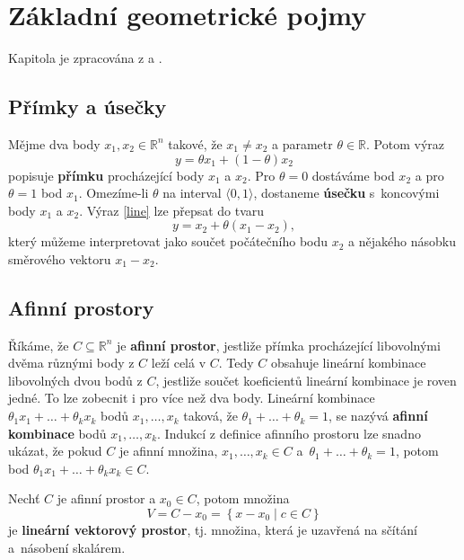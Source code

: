 \chapter{Základní geometrické pojmy}

Kapitola je zpracována z \cite{convex-optimization} a \cite{lectures-on-discrete-geometry}.

\section{Přímky a úsečky}

Mějme dva body $x_1, x_2 \in \mathbb{R}^n$ takové, že $x_1 \neq x_2$ a parametr $\theta \in \mathbb{R}$. Potom výraz
\begin{equation}
    y = \theta x_1 + (1 - \theta) x_2
    \label{line}
\end{equation}
popisuje \textbf{přímku} procházející body $x_1$ a $x_2$. Pro $\theta = 0$ dostáváme bod $x_2$ a pro $\theta = 1$ bod $x_1$. Omezíme-li $\theta$ na interval $\langle 0, 1 \rangle$, dostaneme \textbf{úsečku} s~koncovými body $x_1$ a $x_2$. Výraz \ref{line} lze přepsat do tvaru
$$
    y = x_2 + \theta (x_1 - x_2),
$$
který můžeme interpretovat jako součet počátečního bodu $x_2$ a nějakého násobku směrového vektoru $x_1 - x_2$.

\section{Afinní prostory}

Říkáme, že $C \subseteq \mathbb{R}^n$ je \textbf{afinní prostor}, jestliže přímka procházející libovolnými dvěma různými body z $C$ leží celá v $C$. Tedy $C$ obsahuje lineární kombinace libovolných dvou bodů z $C$, jestliže součet koeficientů lineární kombinace je roven jedné. To lze zobecnit i pro více než dva body. Lineární kombinace $\theta_1 x_1 + \dots + \theta_k x_k$ bodů $x_1, \dots, x_k$ taková, že $\theta_1 + \dots + \theta_k = 1$, se nazývá \textbf{afinní kombinace} bodů $x_1, \dots, x_k$. Indukcí z definice afinního prostoru lze snadno ukázat, že pokud $C$ je afinní množina, $x_1, \dots, x_k \in C$ a~$\theta_1 + \dots + \theta_k = 1$, potom bod $\theta_1 x_1 + \dots + \theta_k x_k \in C$.

\noindent Nechť $C$ je afinní prostor a $x_0 \in C$, potom množina
$$
    V = C - x_0 = \left\{ x - x_0 \mid c \in C \right\}
$$
je \textbf{lineární vektorový prostor}, tj. množina, která je uzavřená na sčítání a~násobení skalárem.

